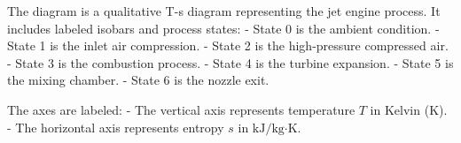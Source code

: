 The diagram is a qualitative T-s diagram representing the jet engine process. It includes labeled isobars and process states:  
- State 0 is the ambient condition.  
- State 1 is the inlet air compression.  
- State 2 is the high-pressure compressed air.  
- State 3 is the combustion process.  
- State 4 is the turbine expansion.  
- State 5 is the mixing chamber.  
- State 6 is the nozzle exit.  

The axes are labeled:  
- The vertical axis represents temperature \( T \) in Kelvin (\( \text{K} \)).  
- The horizontal axis represents entropy \( s \) in \( \text{kJ/kg·K} \).
